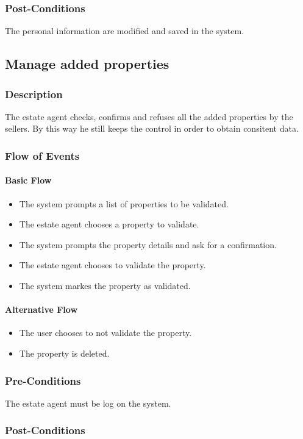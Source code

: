\documentclass[a4paper,12pt]{article}
\begin{document}
\subsubsection{Post-Conditions}
The personal information are modified and saved in the system.

\subsection{Manage added properties}
\subsubsection{Description}
The estate agent checks, confirms and refuses all the added properties by the sellers. By this way he still keeps the control in order to obtain consitent data.
\subsubsection{Flow of Events}
\paragraph{Basic Flow}
\begin{itemize}
\item The system prompts a list of properties to be validated.
\item The estate agent chooses a property to validate.
\item The system prompts the property details and ask for a confirmation.
\item The estate agent chooses to validate the property.
\item The system markes the property as validated.
\end{itemize}
\paragraph{Alternative Flow}
\begin{itemize}
\item The user chooses to not validate the property.
\item The property is deleted.
\end{itemize}
\subsubsection{Pre-Conditions}
The estate agent must be log on the system.
\subsubsection{Post-Conditions}
\end{document}
